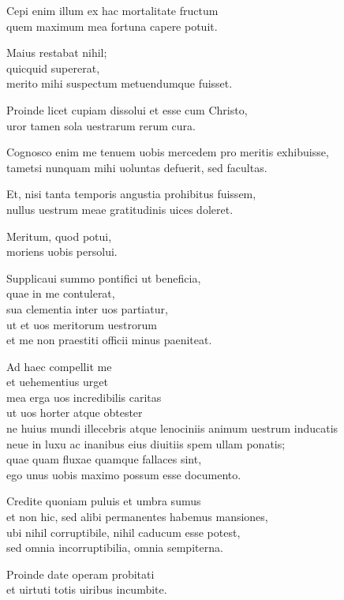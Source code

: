 \documentclass[a5paper,twoside]{article}
\begin{document}
Cepi enim illum ex hac mortalitate fructum \\
quem maximum mea fortuna capere potuit.   

Maius restabat nihil; \\
quicquid supererat, \\
merito mihi suspectum metuendumque fuisset.   

Proinde licet cupiam dissolui et esse cum Christo, \\
uror tamen sola uestrarum rerum cura.  

Cognosco enim me tenuem uobis mercedem pro meritis exhibuisse, \\
tametsi nunquam mihi uoluntas defuerit, sed facultas.  

Et, nisi tanta temporis angustia prohibitus fuissem, \\
nullus uestrum meae gratitudinis uices doleret.  

Meritum, quod potui, \\
moriens uobis persolui.  

Supplicaui summo pontifici ut beneficia, \\
quae in me contulerat, \\
sua clementia inter uos partiatur, \\
ut et uos meritorum uestrorum \\
et me non praestiti officii minus paeniteat.  

Ad haec compellit me \\
et uehementius urget \\
mea erga uos incredibilis caritas \\
ut uos horter atque obtester \\
ne huius mundi illecebris atque lenociniis animum uestrum inducatis \\
neue in luxu ac inanibus eius diuitiis spem ullam ponatis; \\
quae quam fluxae quamque fallaces sint, \\
ego unus uobis maximo possum esse documento.   

Credite quoniam puluis et umbra sumus \\
et non hic, sed alibi permanentes habemus mansiones, \\
ubi nihil corruptibile, nihil caducum esse potest, \\
sed omnia incorruptibilia, omnia sempiterna.  

Proinde date operam probitati \\
et uirtuti totis uiribus incumbite.  
\end{document}
